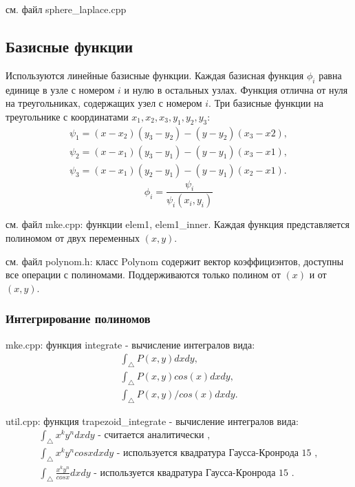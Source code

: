 \documentclass[a4paper,article]{article}
\begin{document}
см. файл sphere\_laplace.cpp

\subsection{Базисные  функции}
Используются линейные базисные функции. Каждая базисная функция $\phi_i$ равна единице в узле с номером $i$ и нулю в остальных узлах. Функция отлична от нуля на треугольниках, содержащих узел с номером $i$.
Три базисные функции на треугольнике с координатами $x_1,x_2,x_3, y_1,y_2,y_3$:
\begin{equation*}
\begin{split}
\psi_1=(x-x_2)(y_3-y_2)-(y-y_2)(x_3-x2),\\
\psi_2=(x-x_1)(y_3-y_1)-(y-y_1)(x_3-x1),\\
\psi_3=(x-x_1)(y_2-y_1)-(y-y_1)(x_2-x1).
\end{split}
\end{equation*} 
\begin{equation*}
\phi_i=\frac{\psi_i}{\psi_i(x_i,y_i)}
\end{equation*}

см. файл mke.cpp: функции elem1, elem1\_inner.
Каждая функция представляется полиномом от двух переменных $(x,y)$.

см. файл polynom.h: класс Polynom содержит вектор коэффициэнтов, доступны все операции с полиномами. Поддерживаются только полином от $(x)$ и от $(x,y)$.

\subsubsection{Интегрирование  полиномов} 
mke.cpp: функция integrate - вычисление интегралов вида:
\begin{equation*}
\begin{split}
\int_\bigtriangleup P(x,y) dx dy,\\
\int_\bigtriangleup P(x,y) cos(x) dx dy,\\
\int_\bigtriangleup P(x,y) / cos(x) dx dy.
\end{split}
\end{equation*}

util.cpp: функция trapezoid\_integrate - вычисление интегралов вида:
\begin{equation*}
\begin{split}
\int_\bigtriangleup x^k y^n dx dy\text { - считается аналитически }, \\
\int_\bigtriangleup x^k y^n cos x dx dy\text{ - используется квадратура Гаусса-Кронрода 15 } ,\\
\int_\bigtriangleup \frac{x^k y^n}{cos x} dx dy\text{ - используется квадратура Гаусса-Кронрода 15 }.
\end{split}
\end{equation*}
\end{document}
